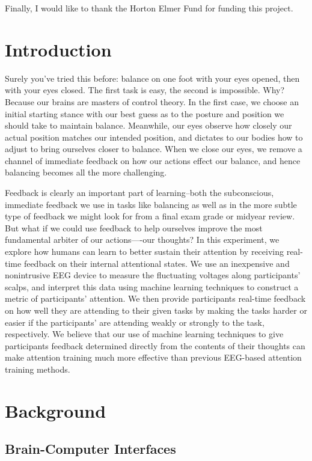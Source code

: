 \documentclass[12pt]{report}
\begin{document}
	Finally, I would like to thank the Horton Elmer Fund for funding this project.  
   
\tableofcontents

\chapter{Introduction}
	Surely you've tried this before: balance on one foot with your eyes opened, then with your eyes closed.  The first task is easy, the second is impossible.  Why?  Because our brains are masters of control theory.  In the first case, we choose an initial starting stance with our best guess as to the posture and position we should take to maintain balance.  Meanwhile, our eyes observe how closely our actual position matches our intended position, and dictates to our bodies how to adjust to bring ourselves closer to balance.  When we close our eyes, we remove a channel of immediate feedback on how our actions effect our balance, and hence balancing becomes all the more challenging.

	Feedback is clearly an important part of learning--both the subconscious, immediate feedback we use in tasks like balancing as well as in the more subtle type of feedback we might look for from a final exam grade or midyear review.  But what if we could use feedback to help ourselves improve the most fundamental arbiter of our actions—-our thoughts?  In this experiment, we explore how humans can learn to better sustain their attention by receiving real-time feedback on their internal attentional states.  We use an inexpensive and nonintrusive EEG device to measure the fluctuating voltages along participants’ scalps, and interpret this data using machine learning techniques to construct a metric of participants’ attention.  We then provide participants real-time feedback on how well they are attending to their given tasks by making the tasks harder or easier if the participants’ are attending weakly or strongly to the task, respectively.  We believe that our use of machine learning techniques to give participants feedback determined directly from the contents of their thoughts can make attention training much more effective than previous EEG-based attention training methods. 

\chapter{Background}

\section{Brain-Computer Interfaces}
	
\end{document}
